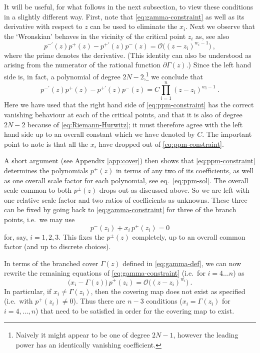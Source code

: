 \documentclass[a4paper,11pt]{article}
\numberwithin{equation}{section}
\def\be{\begin{equation}}
\def\ee{\end{equation}}
\begin{document}
It will be useful, for what follows in the next subsection, to view these conditions in a slightly different  way. First, note that \eqref{eq:gamma-constraint} as well as its derivative with respect to $z$ can be used to eliminate the $x_i$. Next we observe that the `Wronskian' behaves in the vicinity of the critical point $z_i$ as, see also \cite{Lunin:2001,Pakman:2009,Roumpedakis:2018tdb} 
\be
p^{-\prime}(z)p^+(z)-p^{+\prime}(z)p^-(z)  =  \mathcal{O}\bigl((z-z_i)^{w_i-1}\bigr) \ ,
\ee
where the prime denotes the derivative. (This identity can also be understood as arising from the numerator of the rational function $\partial\Gamma(z)$.) 
Since the left hand side is, in fact, a polynomial of degree $2N-2$,\footnote{Naively it might appear to be one of degree $2N-1$, however the leading power has an identically vanishing coefficient.} we conclude that 
\begin{equation}
p^{-\prime}(z)p^+(z)-p^{+\prime}(z)p^-(z) = C\prod_{i=1}^n(z-z_i)^{w_i-1}\ .
\label{eq:ppm-constraint}
\end{equation}
Here we have used that the right hand side of \eqref{eq:ppm-constraint} has the correct vanishing behaviour at each of the critical points, and that it is also of degree $2N-2$ because of  \eqref{eq:Riemann-Hurwitz}; it must therefore agree with the left hand side up to an overall constant which we have denoted by $C$. The important point to note is that all the $x_i$ have dropped out of \eqref{eq:ppm-constraint}. 

A short argument (see Appendix \ref{app:cover}) then shows that \eqref{eq:ppm-constraint} determines the polynomials $p^{\pm}(z)$ in terms of any two of its coefficients, as well as one overall scale factor for each polynomial, see eq.~\eqref{eq:ppm-sol}.
The overall scale common to both $p^{\pm}(z)$ drops out as discussed above. So we are left with one relative scale factor and two ratios of coefficients as unknowns. These three can be fixed by going back to \eqref{eq:gamma-constraint} for three of the branch points, i.e.\ we may use  
\begin{equation}
p^-(z_i)+x_i\,p^+(z_i) = 0
\label{eq:gamma-constr-sp0}
\end{equation}  
for, say, $i=1,2,3$. This fixes the $p^{\pm}(z)$ completely, up to an overall common factor (and up to discrete choices). 

In terms of the branched cover $\Gamma(z)$ defined in \eqref{eq:gamma-def}, we can now rewrite the remaining equations of \eqref{eq:gamma-constraint} (i.e.\ for $i=4\ldots n$) as
\begin{equation}
\bigl(x_i-\Gamma(z)\bigr)\,p^+(z_i) = \mathcal{O}\bigl((z-z_i)^{w_i}\bigr)\ .
\label{eq:gamma-rest}
\end{equation}
In particular, if $x_i\neq \Gamma(z_i)$, then the covering map does not exist as specified (i.e.\ with $p^+(z_i)\neq 0$). Thus there are $n-3$ conditions ($x_i = \Gamma(z_i)$ for $i=4,\ldots,n$) that need to be satisfied in order for the covering map to exist.
\end{document}
